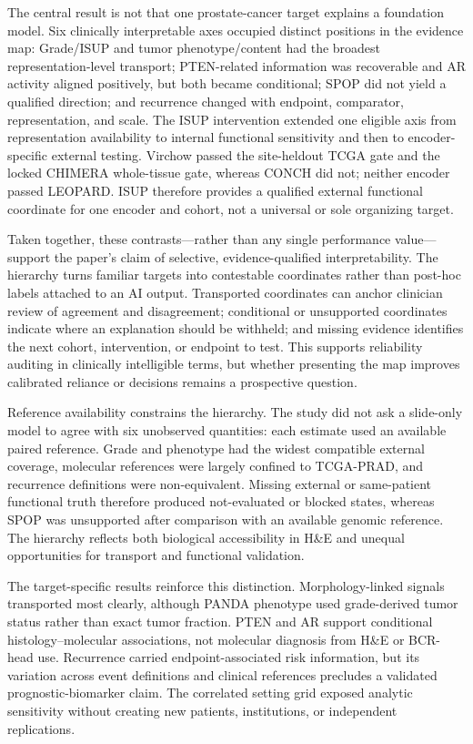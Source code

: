 The central result is not that one prostate-cancer target explains a foundation model. Six
clinically interpretable axes occupied distinct positions in the evidence map: Grade/ISUP and
tumor phenotype/content had the broadest representation-level transport; PTEN-related
information was recoverable and AR activity aligned positively, but both became conditional;
SPOP did not yield a qualified direction; and recurrence changed with endpoint, comparator,
representation, and scale. The ISUP intervention extended one eligible axis from representation
availability to internal functional sensitivity and then to encoder-specific external testing.
Virchow passed the site-heldout TCGA gate and the locked CHIMERA whole-tissue gate, whereas
CONCH did not; neither encoder passed LEOPARD. ISUP therefore provides a qualified external
functional coordinate for one encoder and cohort, not a universal or sole organizing target.

Taken together, these contrasts---rather than any single performance value---support the paper's
claim of selective, evidence-qualified interpretability. The hierarchy turns familiar targets
into contestable coordinates rather than post-hoc labels attached to an AI output. Transported coordinates can anchor clinician
review of agreement and disagreement; conditional or unsupported coordinates indicate where
an explanation should be withheld; and missing evidence identifies the next cohort,
intervention, or endpoint to test. This supports reliability auditing in clinically intelligible
terms, but whether presenting the map improves calibrated reliance or decisions remains a
prospective question.

Reference availability constrains the hierarchy. The study did not ask a slide-only model to
agree with six unobserved quantities: each estimate used an available paired reference. Grade
and phenotype had the widest compatible external coverage, molecular references were largely
confined to TCGA-PRAD, and recurrence definitions were non-equivalent. Missing external or
same-patient functional truth therefore produced not-evaluated or blocked states, whereas SPOP
was unsupported after comparison with an available genomic reference. The hierarchy reflects
both biological accessibility in H\&E and unequal opportunities for transport and functional
validation.

The target-specific results reinforce this distinction. Morphology-linked signals transported
most clearly, although PANDA phenotype used grade-derived tumor status rather than exact tumor
fraction. PTEN and AR support conditional histology--molecular associations, not molecular
diagnosis from H\&E or BCR-head use. Recurrence carried endpoint-associated risk information,
but its variation across event definitions and clinical references precludes a validated
prognostic-biomarker claim. The correlated setting grid exposed analytic sensitivity without
creating new patients, institutions, or independent replications.

